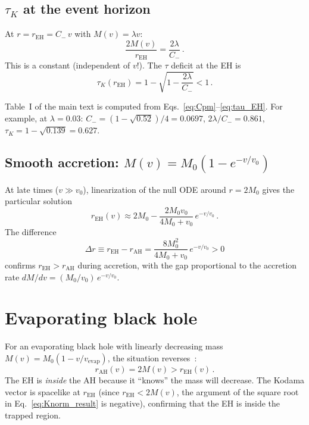 \documentclass[prl,twocolumn,superscriptaddress,longbibliography,floatfix]{revtex4-2}
\newcommand{\tauasym}{\tau}
\begin{document}
\subsection{$\tauasym_K$ at the event horizon}

At $r = r_{\text{EH}} = C_{-}\,v$ with
$M(v) = \lambda v$:
\begin{equation}
  \frac{2M(v)}{r_{\text{EH}}}
  = \frac{2\lambda}{C_{-}}\,.
  \label{eq:ratio}
\end{equation}
This is a constant (independent of $v$!).
The $\tauasym$ deficit at the EH is
\begin{equation}
  \tauasym_K(r_{\text{EH}}) = 1
  - \sqrt{1 - \frac{2\lambda}{C_{-}}} < 1\,.
  \label{eq:tau_EH}
\end{equation}

Table~I of the main text is computed from
Eqs.~\eqref{eq:Cpm}--\eqref{eq:tau_EH}.
For example, at $\lambda = 0.03$:
$C_{-} = (1-\sqrt{0.52})/4 = 0.0697$,
$2\lambda/C_{-} = 0.861$,
$\tauasym_K = 1 - \sqrt{0.139} = 0.627$.

\subsection{Smooth accretion: $M(v) = M_0(1-e^{-v/v_0})$}

At late times ($v \gg v_0$), linearization of the null
ODE around $r = 2M_0$ gives the particular solution
\begin{equation}
  r_{\text{EH}}(v) \approx 2M_0
  - \frac{2M_0 v_0}{4M_0 + v_0}\,e^{-v/v_0}\,.
  \label{eq:rEH_smooth}
\end{equation}
The difference
\begin{equation}
  \Delta r \equiv r_{\text{EH}} - r_{\text{AH}}
  = \frac{8M_0^2}{4M_0 + v_0}\,e^{-v/v_0} > 0
  \label{eq:Delta_r}
\end{equation}
confirms $r_{\text{EH}} > r_{\text{AH}}$ during
accretion, with the gap proportional to the accretion
rate $dM/dv = (M_0/v_0)\,e^{-v/v_0}$.

\section{Evaporating black hole}
\label{sec:evaporation}

For an evaporating black hole with linearly decreasing
mass $M(v) = M_0(1 - v/v_{\text{evap}})$, the
situation reverses~\cite{Hiscock1981}:
\begin{equation}
  r_{\text{AH}}(v) = 2M(v) > r_{\text{EH}}(v)\,.
\end{equation}
The EH is \emph{inside} the AH because it ``knows''
the mass will decrease.  The Kodama vector is spacelike
at $r_{\text{EH}}$ (since $r_{\text{EH}} < 2M(v)$,
the argument of the square root in
Eq.~\eqref{eq:Knorm_result} is negative), confirming
that the EH is inside the trapped region.
\end{document}
